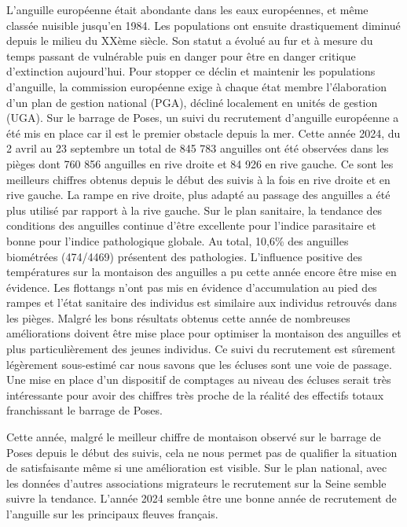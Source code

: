 \documentclass[11pt,titlepage,twoside]{article}\usepackage[]{graphicx}\usepackage[table]{xcolor}
\begin{document}
L’anguille européenne était abondante dans les eaux européennes, et même classée nuisible jusqu’en 1984. Les populations ont ensuite drastiquement diminué depuis le milieu du XXème siècle. Son statut a évolué au fur et à mesure du temps passant de \og vulnérable \fg{} puis \og en danger \fg{} pour être \og en danger critique d’extinction \fg{} aujourd’hui. Pour stopper ce déclin et maintenir les populations d’anguille, la commission européenne exige à chaque état membre l’élaboration d’un plan de gestion national (PGA), décliné localement en unités de gestion (UGA). Sur le barrage de Poses, un suivi du recrutement d’anguille européenne a été mis en place car il est le premier obstacle depuis la mer. Cette année 2024, du 2 avril au 23 septembre un total de 845 783 anguilles ont été observées dans les pièges dont 760 856 anguilles en rive droite et 84 926 en rive gauche. Ce sont les meilleurs chiffres obtenus depuis le début des suivis à la fois en rive droite et en rive gauche. La rampe en rive droite, plus adapté au passage des anguilles a été plus utilisé par rapport à la rive gauche. Sur le plan sanitaire, la tendance des conditions des anguilles continue d’être excellente pour l’indice parasitaire et bonne pour l’indice pathologique globale. Au total, 10,6\% des anguilles biométrées (474/4469) présentent des pathologies. L’influence positive des températures sur la montaison des anguilles a pu cette année encore être mise en évidence. Les flottangs n’ont pas mis en évidence d’accumulation au pied des rampes et l’état sanitaire des individus est similaire aux individus retrouvés dans les pièges. Malgré les bons résultats obtenus cette année de nombreuses améliorations doivent être mise place pour optimiser la montaison des anguilles et plus particulièrement des jeunes individus. Ce suivi du recrutement est sûrement légèrement sous-estimé car nous savons que les écluses sont une voie de passage. Une mise en place d’un dispositif de comptages au niveau des écluses serait très intéressante pour avoir des chiffres très proche de la réalité des effectifs totaux franchissant le barrage de Poses.

\vspace{0.5cm}
Cette année, malgré le meilleur chiffre de montaison observé sur le barrage de Poses depuis le début des suivis, cela ne nous permet pas de qualifier la situation de satisfaisante même si une amélioration est visible. Sur le plan national, avec les données d’autres associations migrateurs le recrutement sur la Seine semble suivre la tendance. L’année 2024 semble être une bonne année de recrutement de l’anguille sur les principaux fleuves français.





\normalsize
\null
\vfill
\end{document}
